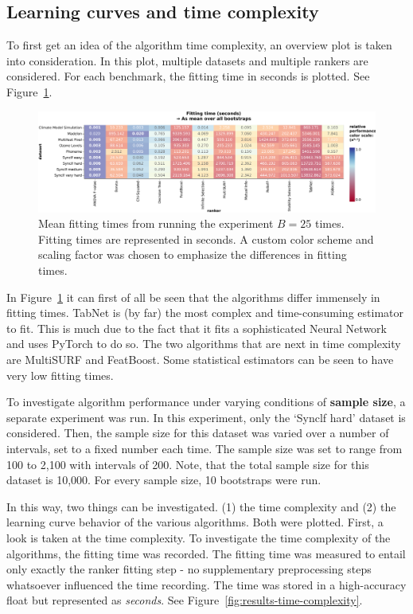 \documentclass[../main.tex]{subfiles}
\begin{document}
\subsection{Learning curves and time complexity}
To first get an idea of the algorithm time complexity, an overview plot is taken into consideration. In this plot, multiple datasets and multiple rankers are considered. For each benchmark, the fitting time in seconds is plotted. See Figure~\ref{fig:results-all-datasets-fitting-time}.

\begin{figure}[ht]
    \centering
    \includegraphics[width=\linewidth]{report/images/results-all-datasets-fitting-time.pdf}
    \caption{Mean fitting times from running the experiment $B=25$ times. Fitting times are represented in seconds. A custom color scheme and scaling factor was chosen to emphasize the differences in fitting times.}
    \label{fig:results-all-datasets-fitting-time}
\end{figure}


In Figure~\ref{fig:results-all-datasets-fitting-time} it can first of all be seen that the algorithms differ immensely in fitting times. TabNet is (by far) the most complex and time-consuming estimator to fit. This is much due to the fact that it fits a sophisticated Neural Network and uses PyTorch to do so. The two algorithms that are next in time complexity are MultiSURF and FeatBoost. Some statistical estimators can be seen to have very low fitting times.

To investigate algorithm performance under varying conditions of \textbf{sample size}, a separate experiment was run. In this experiment, only the `Synclf hard' dataset is considered. Then, the sample size for this dataset was varied over a number of intervals, set to a fixed number each time. The sample size was set to range from 100 to 2,100 with intervals of 200. Note, that the total sample size for this dataset is 10,000. For every sample size, 10 bootstraps were run.

In this way, two things can be investigated. (1) the time complexity and (2) the learning curve behavior of the various algorithms. Both were plotted. First, a look is taken at the time complexity. To investigate the time complexity of the algorithms, the fitting time was recorded. The fitting time was measured to entail only exactly the ranker fitting step - no supplementary preprocessing steps whatsoever influenced the time recording. The time was stored in a high-accuracy float but represented as \textit{seconds}.  See Figure~\ref{fig:results-time-complexity}.
\end{document}
